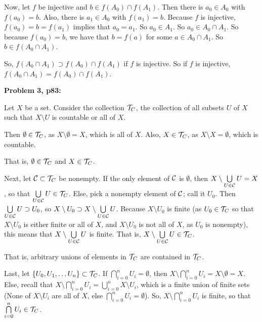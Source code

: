 \documentclass[a4paper,12pt]{article}
\begin{document}
Now, let $f$ be injective and $b \in f(A_0) \cap f(A_1)$. Then there is $a_0 \in A_0$ with $f(a_0) = b$. Also, there is $a_1 \in A_0$ with $f(a_1) = b$. Because $f$ is injective, $f(a_0) = b = f(a_1)$ implies that $a_0=a_1$. So $a_0 \in A_1$. So $a_0 \in A_0 \cap A_1$. So because $f(a_0) = b$, we have that $b = f(a)$ for some $a \in A_0 \cap A_1$. So $b \in f(A_0 \cap A_1)$. 

So, $f(A_0 \cap A_1) \supset f(A_0) \cap f(A_1)$ if $f$ is injective. So if $f$ is injective, $f(A_0 \cap A_1) = f(A_0) \cap f(A_1)$.

\shunt

{\bf Problem 3, p83:}

Let $X$ be a set. Consider the collection $\mathcal{T}_C$, the collection of all subsets $U$ of $X$ such that $X \setminus U$  is countable or all of $X$.

Then $\emptyset \in \mathcal{T}_C$, as $X \setminus \emptyset = X$, which is all of $X$.
Also, $X \in \mathcal{T}_C$, as $X \setminus X = \emptyset$, which is countable. 

That is, $\emptyset \in \mathcal{T}_C$ and $X \in \mathcal{T}_C$.

Next, let $\mathcal{C} \subset \mathcal{T}_C$ be nonempty. If the only element of $\mathcal{C}$ is $\emptyset$, then $X \setminus \bigcup\limits_{U \in \mathcal{C}} U = X$, so that $\bigcup\limits_{U \in \mathcal{C}} U \in \mathcal{T}_C$. Else, pick a nonempty element of $\mathcal{C}$; call it $U_0$. Then $\bigcup\limits_{U \in \mathcal{C}} U \supset U_0$, so $X \setminus U_0 \supset X \setminus \bigcup\limits_{U \in \mathcal{C}} U$. Because $X \setminus U_0$ is finite (as $U_0 \in \mathcal{T}_C$ so that $X \setminus U_0$ is either finite or all of $X$, and $X \setminus U_0$ is not all of $X$, as $U_0$ is nonempty), this means that $ X \setminus \bigcup\limits_{U \in \mathcal{C}} U$ is finite. That is, $ X \setminus \bigcup\limits_{U \in \mathcal{C}} U \in \mathcal{T}_C$.

That is, arbitrary unions of elements in $\mathcal{T}_C$ are contained in $\mathcal{T}_C$.

Last, let $\{U_0, U_1, \ldots U_n \} \subset \mathcal{T}_C$. If $\bigcap\limits_{i=0}^n U_i = \emptyset$, then $X \setminus \bigcap\limits_{i=0}^n U_i = X \setminus \emptyset = X$. Else, recall that $X \setminus \bigcap\limits_{i=0}^n U_i = \bigcup\limits_{i=0}^n X \setminus U_i$, which is a finite union of finite sets (None of $X \setminus U_i$ are all of $X$, else $\bigcap\limits_{i=0}^n U_i = \emptyset$). So, $X \setminus \bigcap\limits_{i=0}^n U_i $ is finite, so that $\bigcap\limits_{i=0}^n U_i \in \mathcal{T}_C$.
\end{document}
